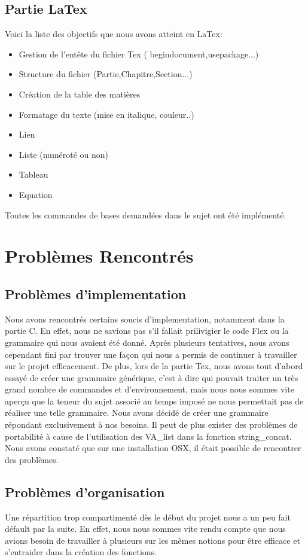 \documentclass{report}
\begin{document}
\section{Partie LaTex}
Voici la liste des objectifs que nous avons atteint en LaTex:
\begin{itemize}
\item Gestion de l'entête du fichier Tex ( begindocument,usepackage...)
\item Structure du fichier (Partie,Chapitre,Section...)
\item Création de la table des matières
\item Formatage du texte (mise en italique, couleur..)
\item Lien
\item Liste (numéroté ou non)
\item Tableau
\item Equation
\end{itemize}
Toutes les commandes de bases demandées dans le sujet ont été implémenté.
\chapter{Problèmes Rencontrés}
\section{Problèmes d'implementation}
Nous avons rencontrés certains soucis d'implementation, notamment dans la partie C. En effet, nous ne savions pas s'il fallait prilivigier le code Flex ou la grammaire qui nous avaient été donné. Après plusieurs tentatives, nous avons cependant fini par trouver une façon qui nous a permis de continuer à travailler sur le projet efficacement.
De plus, lors de la partie Tex, nous avons tout d'abord essayé de créer une grammaire  générique, c'est à dire qui pouvait traiter un très grand nombre de commandes et d'environnement, mais nous nous sommes vite aperçu que la teneur du sujet associé au temps imposé ne nous permettait pas de réaliser une telle grammaire.
Nous avons décidé de créer une grammaire répondant exclusivement à nos besoins.
Il peut de plus exister des problèmes de portabilité à cause de l'utilisation des VA_list dans la fonction string_concat. Nous avons constaté que sur une installation OSX, il était possible de rencontrer des problèmes.
\section{Problèmes d'organisation}
Une répartition trop compartimenté dès le début du projet nous a un peu fait défault par la suite. En effet, nous nous sommes vite rendu compte que nous avions besoin de travailler à plusieurs sur les mêmes notions pour être efficace et s'entraider dans la création des fonctions.
\end{document}
